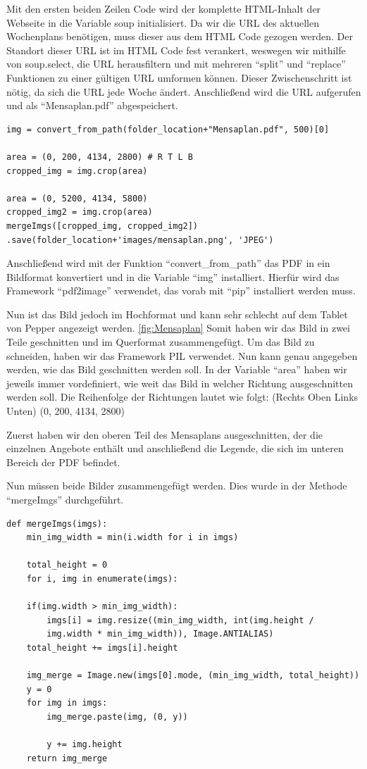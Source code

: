 Mit den ersten beiden Zeilen Code wird der komplette HTML-Inhalt der Webseite in die Variable soup initialisiert. Da wir die URL des aktuellen Wochenplans benötigen, muss dieser aus dem HTML Code gezogen werden. Der Standort dieser URL ist im HTML Code fest verankert, weswegen wir mithilfe von soup.select, die URL herausfiltern und mit mehreren ``split'' und ``replace'' Funktionen zu einer gültigen URL umformen können. Dieser Zwischenschritt ist nötig, da sich die URL jede Woche ändert. Anschließend wird die URL aufgerufen und als ``Mensaplan.pdf'' abgespeichert.

\begin{lstlisting}
img = convert_from_path(folder_location+"Mensaplan.pdf", 500)[0]

area = (0, 200, 4134, 2800) # R T L B
cropped_img = img.crop(area)

area = (0, 5200, 4134, 5800)
cropped_img2 = img.crop(area)
mergeImgs([cropped_img, cropped_img2])
.save(folder_location+'images/mensaplan.png', 'JPEG')
\end{lstlisting}

Anschließend wird mit der Funktion ``convert\_from\_path'' das PDF in ein Bildformat konvertiert und in die Variable ``img'' installiert. Hierfür wird das Framework ``pdf2image'' verwendet, das vorab mit ``pip'' installiert werden muss. 

Nun ist das Bild jedoch im Hochformat und kann sehr schlecht auf dem Tablet von Pepper angezeigt werden. \ref{fig:Mensaplan} Somit haben wir das Bild in zwei Teile geschnitten und im Querformat zusammengefügt. Um das Bild zu schneiden, haben wir das Framework PIL verwendet. Nun kann genau angegeben werden, wie das Bild geschnitten werden soll. In der Variable ``area'' haben wir jeweils immer vordefiniert, wie weit das Bild in welcher Richtung ausgeschnitten werden soll. Die Reihenfolge der Richtungen lautet wie folgt: 
(Rechts Oben Links Unten) (0, 200, 4134, 2800)

Zuerst haben wir den oberen Teil des Mensaplans ausgeschnitten, der die einzelnen Angebote enthält und anschließend die Legende, die sich im unteren Bereich der PDF befindet. 

Nun müssen beide Bilder zusammengefügt werden. Dies wurde in der Methode ``mergeImgs'' durchgeführt.


\begin{lstlisting}
def mergeImgs(imgs):
    min_img_width = min(i.width for i in imgs)
    
    total_height = 0
    for i, img in enumerate(imgs):
    
    if(img.width > min_img_width):
        imgs[i] = img.resize((min_img_width, int(img.height / 
        img.width * min_img_width)), Image.ANTIALIAS)
    total_height += imgs[i].height
    
    img_merge = Image.new(imgs[0].mode, (min_img_width, total_height))
    y = 0
    for img in imgs:
        img_merge.paste(img, (0, y))
    
        y += img.height
    return img_merge
\end{lstlisting}

